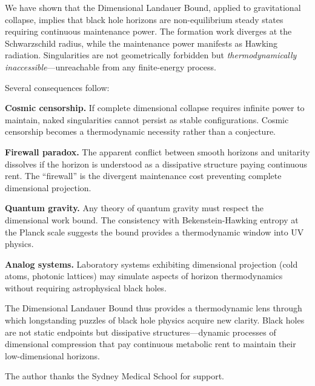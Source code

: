 \documentclass[aps,prd,twocolumn,superscriptaddress,floatfix]{revtex4-2}
\begin{document}
We have shown that the Dimensional Landauer Bound, applied to gravitational collapse, implies that black hole horizons are non-equilibrium steady states requiring continuous maintenance power. The formation work diverges at the Schwarzschild radius, while the maintenance power manifests as Hawking radiation. Singularities are not geometrically forbidden but \emph{thermodynamically inaccessible}---unreachable from any finite-energy process.

Several consequences follow:

\textbf{Cosmic censorship.} If complete dimensional collapse requires infinite power to maintain, naked singularities cannot persist as stable configurations. Cosmic censorship becomes a thermodynamic necessity rather than a conjecture.

\textbf{Firewall paradox.} The apparent conflict between smooth horizons and unitarity dissolves if the horizon is understood as a dissipative structure paying continuous rent. The ``firewall'' is the divergent maintenance cost preventing complete dimensional projection.

\textbf{Quantum gravity.} Any theory of quantum gravity must respect the dimensional work bound. The consistency with Bekenstein-Hawking entropy at the Planck scale suggests the bound provides a thermodynamic window into UV physics.

\textbf{Analog systems.} Laboratory systems exhibiting dimensional projection (cold atoms, photonic lattices) may simulate aspects of horizon thermodynamics without requiring astrophysical black holes.

The Dimensional Landauer Bound thus provides a thermodynamic lens through which longstanding puzzles of black hole physics acquire new clarity. Black holes are not static endpoints but dissipative structures---dynamic processes of dimensional compression that pay continuous metabolic rent to maintain their low-dimensional horizons.

\begin{acknowledgments}
The author thanks the Sydney Medical School for support.
\end{acknowledgments}


\end{document}
